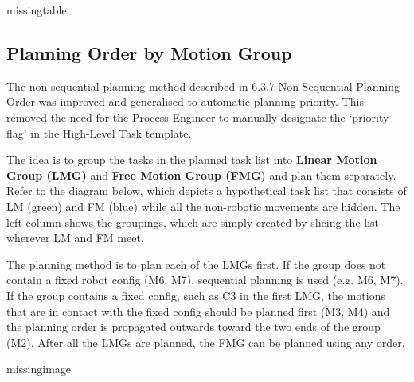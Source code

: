 missingtable

\subsection{Planning Order by Motion Group}
The non-sequential planning method described in 6.3.7 Non-Sequential Planning Order was improved and generalised to automatic planning priority. This removed the need for the Process Engineer to manually designate the ‘priority flag’ in the High-Level Task template. 

The idea is to group the tasks in the planned task list into \textbf{Linear Motion Group (LMG)} and \textbf{Free Motion Group (FMG)} and plan them separately. Refer to the diagram below, which depicts a hypothetical task list that consists of LM (green) and FM (blue) while all the non-robotic movements are hidden. The left column shows the groupings, which are simply created by slicing the list wherever LM and FM meet. 

The planning method is to plan each of the LMGs first. If the group does not contain a fixed robot config (M6, M7), sequential planning is used (e.g. M6, M7). If the group contains a fixed config, such as C3 in the first LMG, the motions that are in contact with the fixed config should be planned first (M3, M4) and the planning order is propagated outwards toward the two ends of the group (M2). After all the LMGs are planned, the FMG can be planned using any order. 

missingimage

